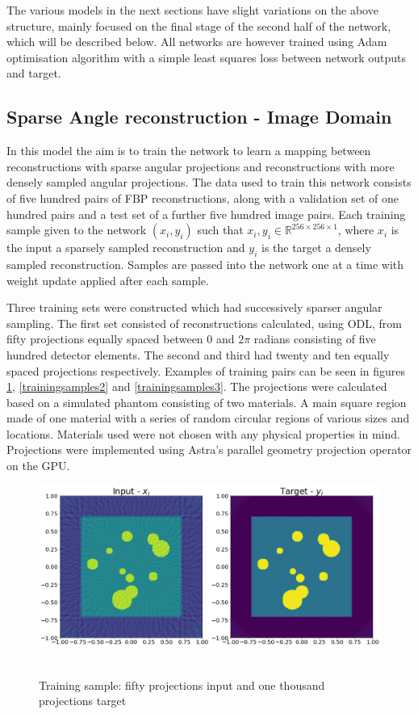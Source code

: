 The various models in the next sections have slight variations on the above structure, mainly focused on the final stage of the second half of the network, which will be described below. All networks are however 
trained using Adam optimisation algorithm with a simple least squares loss between network outputs and target.  

\subsection{Sparse Angle reconstruction - Image Domain}

In this model the aim is to train the network to learn a mapping between reconstructions with sparse angular projections and reconstructions with more densely sampled angular
projections. The data used to train this network consists of five hundred pairs of FBP reconstructions, along with a validation set of one hundred pairs and a test set of a further 
five hundred image pairs. Each training sample given to the network $(x_i,y_i)$ such that $x_i,y_i \in \mathbb{R}^{256 \times 256 \times 1}$, where $x_i$ is the input a sparsely sampled
reconstruction and $y_i$ is the target a densely sampled reconstruction. Samples are passed into the network one at a time with weight update applied after each sample. 

Three training sets were constructed which had successively sparser angular sampling. The first set consisted of reconstructions calculated, using ODL, from fifty projections equally spaced 
between $0$ and $2 \pi$ radians consisting of five hundred detector elements. The second and third had twenty and ten equally spaced projections respectively. Examples of training pairs can be seen in
figures \ref{trainingsamples1}, \ref{trainingsamples2} and \ref{trainingsamples3}. The projections were calculated based on a simulated phantom consisting of two materials. A main square region made of one 
material with a series of random circular regions of various sizes and locations. Materials used were not chosen with any physical properties in mind. Projections were implemented using Astra's 
parallel geometry projection operator on the GPU.

\begin{figure}[htb]
\centering
     \includegraphics[width=\textwidth]{figures/trainingsamples1} \
  \caption{Training sample: fifty projections input and one thousand projections target}
  \label{trainingsamples1}
\end{figure}

